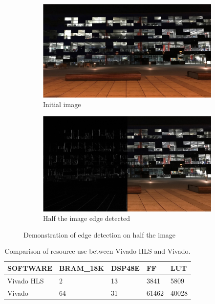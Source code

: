\begin{figure}[h]
    \centering
    \begin{subfigure}[b]{0.6\textwidth}
        \centering
        \includegraphics[width=\textwidth]{beforefilter}
        \caption{Initial image}
        \label{beforefilter}
    \end{subfigure}
    \begin{subfigure}[b]{0.6\textwidth}
        \centering
        \includegraphics[width=\textwidth]{afterfilter}
        \caption{Half the image edge detected}
        \label{afterfilter}
    \end{subfigure}
    \hfill
    \caption{Demonstration of edge detection on half the image}
    \label{edgedetection}
\end{figure}


\begin{table}[h]
\centering
\begin{tabular}{ |p{3cm}||p{2cm}|p{2cm}|p{2cm}|p{2cm}|}
 \hline
 SOFTWARE & BRAM\_18K & DSP48E & FF & LUT\\
 \hline
 \hline
 Vivado HLS   & 2 & 13 &  3841 & 5809\\
 Vivado & 64 & 31 & 61462 & 40028 \\
 \hline
\end{tabular}
\caption{Comparison of resource use between Vivado HLS and Vivado.}
\label{ResourceUse}
\end{table}

